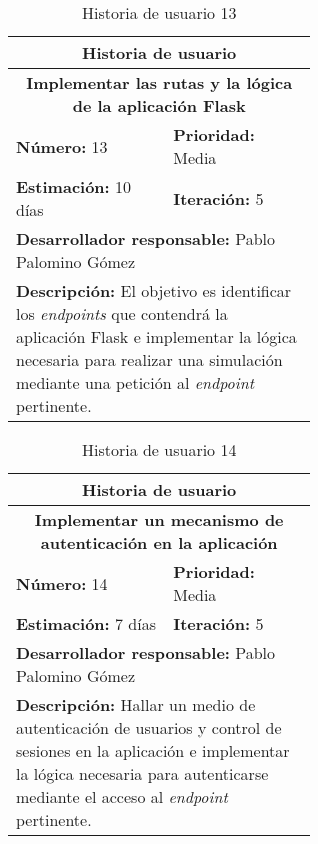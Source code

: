 \begin{table}[H]
        \centering
        \begin{tabular}{|p{0.3\linewidth}|p{0.3\linewidth}|}
          \hline
          \multicolumn{2}{|c|}{Historia de usuario}\\ \hline
          \multicolumn{2}{|c|}{\textbf{Implementar las rutas y la lógica de la aplicación Flask}}\\ \hline
          \textbf{Número:} 13 & \textbf{Prioridad:} Media\\ \hline
          \textbf{Estimación:} 10 días & \textbf{Iteración:} 5\\ \hline
          \multicolumn{2}{|l|}{\textbf{Desarrollador responsable:} Pablo Palomino Gómez}\\ \hline
          \multicolumn{2}{|p{0.6\linewidth}|}{\textbf{Descripción:} El objetivo es identificar los \textit{endpoints} que contendrá la aplicación Flask e implementar la lógica necesaria para realizar una simulación mediante una petición al \textit{endpoint} pertinente.}\\ \hline
        \end{tabular}
        \caption{Historia de usuario 13}
        \label{tab:hist13}
\end{table}
\begin{table}[H]
        \centering
        \begin{tabular}{|p{0.3\linewidth}|p{0.3\linewidth}|}
          \hline
          \multicolumn{2}{|c|}{Historia de usuario}\\ \hline
          \multicolumn{2}{|c|}{\textbf{Implementar un mecanismo de autenticación en la aplicación}}\\ \hline
          \textbf{Número:} 14 & \textbf{Prioridad:} Media\\ \hline
          \textbf{Estimación:} 7 días & \textbf{Iteración:} 5\\ \hline
          \multicolumn{2}{|l|}{\textbf{Desarrollador responsable:} Pablo Palomino Gómez}\\ \hline
          \multicolumn{2}{|p{0.7\linewidth}|}{\textbf{Descripción:} Hallar un medio de autenticación de usuarios y control de sesiones en la aplicación e implementar la lógica necesaria para autenticarse mediante el acceso al \textit{endpoint} pertinente.}\\ \hline
        \end{tabular}
        \caption{Historia de usuario 14}
        \label{tab:hist14}
\end{table}
